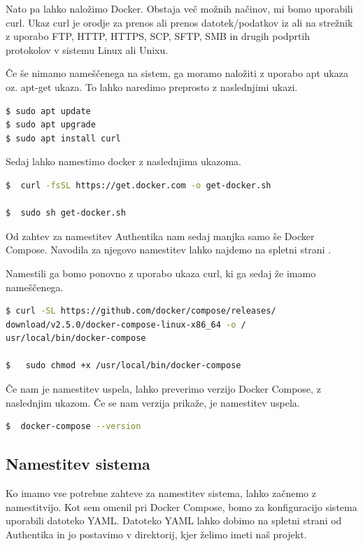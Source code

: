 \documentclass[a4paper,12pt,openright]{book}
\begin{document}
{ Nato pa lahko naložimo Docker. Obstaja več možnih načinov, mi bomo uporabili curl.
 \newline
 Ukaz curl je orodje za prenos ali prenos datotek/podatkov iz ali na strežnik z uporabo FTP, HTTP, HTTPS, SCP, SFTP, SMB in drugih podprtih protokolov v sistemu Linux ali Unixu.
 
 Če še nimamo nameščenega na sistem, ga moramo naložiti z uporabo apt ukaza oz. apt-get ukaza. To lahko naredimo preprosto z naslednjimi ukazi.
 
\begin{lstlisting}[language=bash]
$ sudo apt update
$ sudo apt upgrade
$ sudo apt install curl
\end{lstlisting}

Sedaj lahko namestimo docker z naslednjima ukazoma.


\begin{lstlisting}[language=bash]
$  curl -fsSL https://get.docker.com -o get-docker.sh

$  sudo sh get-docker.sh
\end{lstlisting}

Od zahtev za namestitev Authentika nam sedaj manjka samo še Docker Compose. Navodila za njegovo namestitev lahko najdemo na spletni strani \cite{DockerCompose}. 

Namestili ga bomo ponovno z uporabo ukaza curl, ki ga sedaj že imamo nameščenega.


\begin{lstlisting}[language=bash]
$ curl -SL https://github.com/docker/compose/releases/
download/v2.5.0/docker-compose-linux-x86_64 -o /
usr/local/bin/docker-compose

$   sudo chmod +x /usr/local/bin/docker-compose
\end{lstlisting}

Če nam je namestitev uspela, lahko preverimo verzijo Docker Compose, z naslednjim ukazom. Če se nam verzija prikaže, je namestitev uspela.

\begin{lstlisting}[language=bash]
$  docker-compose --version
\end{lstlisting}

\subsection{Namestitev sistema}

Ko imamo vse potrebne zahteve za namestitev sistema, lahko začnemo z namestitvijo. Kot sem omenil pri Docker Compose, bomo za konfiguracijo sistema uporabili datoteko YAML. Datoteko YAML lahko dobimo na spletni strani od Authentika\cite{AuthentikYAML} in jo postavimo v direktorij, kjer želimo imeti naš projekt. 

}
\end{document}
